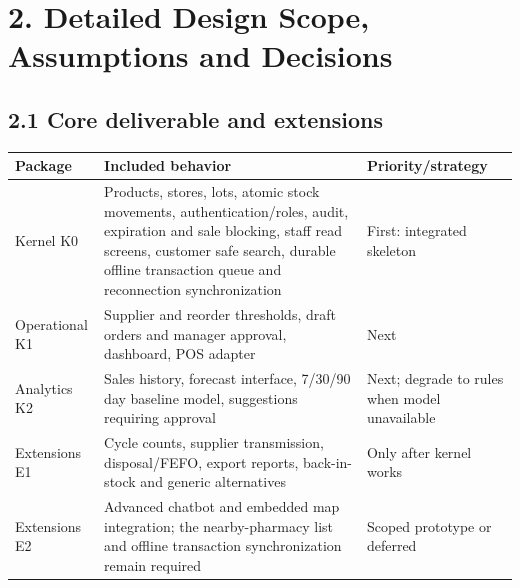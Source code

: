 \clearpage
\section{2. Detailed Design Scope, Assumptions and Decisions}\label{system-scope-assumptions-and-decisions}

\subsection{2.1 Core deliverable and extensions}\label{core-deliverable-and-extensions}

{\def\LTcaptype{none} %
\begin{longtable}[]{|
  >{\raggedright\arraybackslash}m{}|
  >{\raggedright\arraybackslash}m{}|
  >{\raggedright\arraybackslash}m{}|}
\hline
\begin{minipage}[c]{\linewidth}\raggedright
\textbf{Package}
\end{minipage} & \begin{minipage}[c]{\linewidth}\raggedright
\textbf{Included behavior}
\end{minipage} & \begin{minipage}[c]{\linewidth}\raggedright
\textbf{Priority/strategy}
\end{minipage} \\
\hline
\endhead

\endlastfoot
Kernel K0 & Products, stores, lots, atomic stock movements, authentication/roles, audit, expiration and sale blocking, staff read screens, customer safe search, durable offline transaction queue and reconnection synchronization & First: integrated skeleton \\ \hline
Operational K1 & Supplier and reorder thresholds, draft orders and manager approval, dashboard, POS adapter & Next \\ \hline
Analytics K2 & Sales history, forecast interface, 7/30/90 day baseline model, suggestions requiring approval & Next; degrade to rules when model unavailable \\ \hline
Extensions E1 & Cycle counts, supplier transmission, disposal/FEFO, export reports, back-in-stock and generic alternatives & Only after kernel works \\ \hline
Extensions E2 & Advanced chatbot and embedded map integration; the nearby-pharmacy list and offline transaction synchronization remain required & Scoped prototype or deferred \\ \hline
\end{longtable}
}

